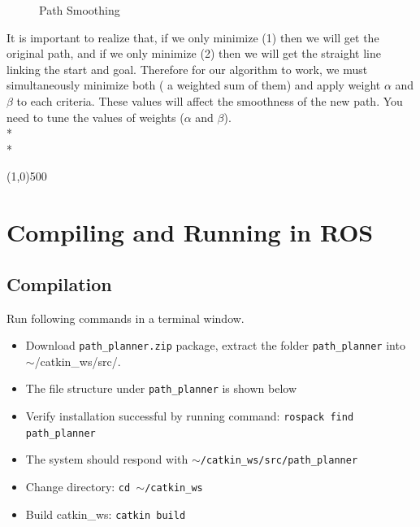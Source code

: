 \documentclass[twoside,11pt]{article}
\begin{document}
   \begin{figure}[t]
   	\centering
   	\caption{Path Smoothing}
   	\label{Exam_con}
   \end{figure}

It is important to realize that, if we only minimize (1) then we will get the original path, and if we
only minimize (2) then we will get the straight line linking the start and goal. Therefore for our
algorithm to work, we must simultaneously minimize both ( a weighted sum of them) and apply
weight $\alpha$ and $\beta$ to each criteria. These values will affect the smoothness of the new path. You need
to tune the values of weights ($\alpha$ and $\beta$).\\*\\*
\begin{center}
\line(1,0){500}
\end{center}



\section*{Compiling and Running in ROS}
\subsection*{Compilation}
Run following commands in a terminal window.
\begin{itemize}
	\item Download \texttt{path\_planner.zip} package, extract the folder \texttt{path\_planner} into
	{$\sim$/catkin\_ws/src/}.
	\item The file structure under \texttt{path\_planner} is shown below
	\item Verify installation successful by running command: \texttt{rospack find path\_planner}
	\item The system should respond with \texttt{$\sim$/catkin\_ws/src/path\_planner}
	\item Change directory:  \texttt{cd $\sim$/catkin\_ws}
	\item Build catkin\_ws: \texttt{catkin build} 
\end{itemize}
\end{document}
